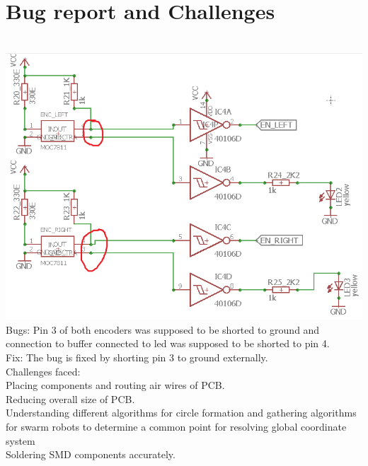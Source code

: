 \documentclass[a4paper,12pt,oneside]{book}
\begin{document}
\section{Bug report and Challenges}
\hfill\\
	\includegraphics[width=\textwidth]{./Capture2.png}
\hfill\\

Bugs: Pin 3 of both encoders was supposed to be shorted to ground and connection to buffer connected to led was supposed to be shorted to pin 4.\\
Fix: The bug is fixed by shorting pin 3 to ground externally.\\

Challenges faced:\\
Placing components and routing air wires of PCB.\\

Reducing overall size of PCB.\\

Understanding different algorithms for circle formation and gathering algorithms for swarm robots to determine a common point for resolving global coordinate system\\

Soldering SMD components accurately.\\
\end{document}
